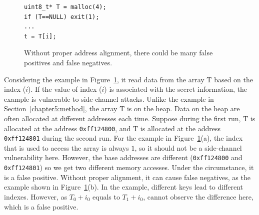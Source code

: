\begin{figure}[h]
  \begin{minipage}{0.45\linewidth}
    \begin{lstlisting}[numbers=none,xleftmargin=.1\textwidth,xrightmargin=.15\textwidth]
uint8_t* T = malloc(4);
if (T==NULL) exit(1);
...
t = T[i];    
\end{lstlisting}
  \end{minipage}
  \hfill
  \begin{minipage}{0.5\linewidth}
  \end{minipage}
  \caption{Without proper address alignment, there could be many false positives and false negatives.}\label{fig:align}
\end{figure}

Considering the example in Figure~\ref{fig:align}, it read data from the array \textsf{T} based on the index ($i$). If the value of index ($i$) is associated with the secret information, the example is vulnerable to side-channel attacks. Unlike the example in Section~\ref{chapter5:method}, the array \textsf{T} is on the heap. Data on the heap are often allocated at different addresses each time. Suppose during the first run, \textsf{T} is allocated at the address \texttt{0xff124800}, and \textsf{T} is allocated at the address \texttt{0xff124801} during the second run. For the example in Figure~\ref{fig:align}(a), the index that is used to access the array is always $1$, so it should not be a side-channel vulnerability here. However, the base addresses are different (\texttt{0xff124800} and \texttt{0xff124801}) so we get two different memory accesses. Under the circumstance, it is a false positive. Without proper alignment, it can cause false negatives, as the example shown in Figure~\ref{fig:align}(b). In the example, different keys lead to different indexes. However, as $T_0 + i_0$ equals to $T_1 + i_0$, \ctool{} cannot observe the difference here, which is a false positive.



